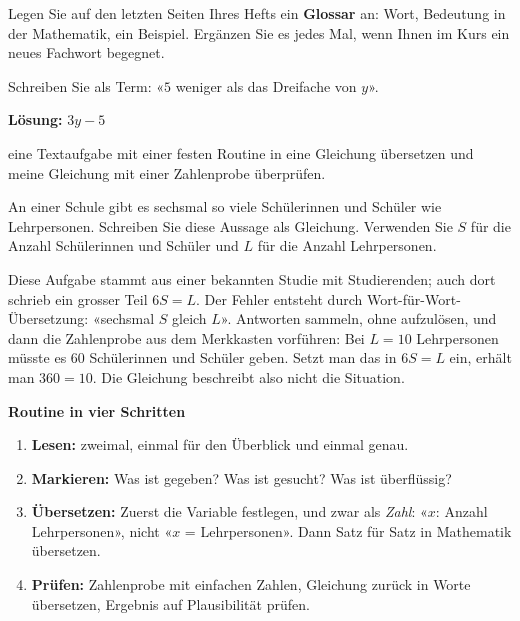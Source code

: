 \documentclass[11pt]{exam}
\begin{document}
\begin{tcolorbox}[fkbasis, colframe=fkgrau, colback=white, title={Ihr Glossar}]
Legen Sie auf den letzten Seiten Ihres Hefts ein \textbf{Glossar} an: Wort,
Bedeutung in der Mathematik, ein Beispiel. Ergänzen Sie es jedes Mal, wenn
Ihnen im Kurs ein neues Fachwort begegnet.
\end{tcolorbox}

\begin{exitfrage}
Schreiben Sie als Term: «$5$ weniger als das Dreifache von $y$».
\ifprintanswers\par\medskip\textbf{Lösung:} $3y - 5$
\else\par\vspace{1.5cm}\fi
\end{exitfrage}

\newpage
{}
  {eine Textaufgabe mit einer festen Routine in eine Gleichung übersetzen und
   meine Gleichung mit einer Zahlenprobe überprüfen.}

\begin{einstieg}
An einer Schule gibt es sechsmal so viele Schülerinnen und Schüler wie
Lehrpersonen. Schreiben Sie diese Aussage als Gleichung. Verwenden Sie $S$
für die Anzahl Schülerinnen und Schüler und $L$ für die Anzahl Lehrpersonen.
\ifprintanswers\else\par\vspace{1.5cm}\fi
\end{einstieg}

\begin{lehrperson}
Diese Aufgabe stammt aus einer bekannten Studie mit Studierenden; auch dort
schrieb ein grosser Teil $6S = L$. Der Fehler entsteht durch
Wort-für-Wort-Übersetzung: «sechsmal $S$ gleich $L$». Antworten sammeln,
ohne aufzulösen, und dann die Zahlenprobe aus dem Merkkasten vorführen:
Bei $L = 10$ Lehrpersonen müsste es $60$ Schülerinnen und Schüler geben. Setzt
man das in $6S = L$ ein, erhält man $360 = 10$. Die Gleichung beschreibt also
nicht die Situation.
\end{lehrperson}

\begin{merke}
\textbf{Routine in vier Schritten}
\begin{enumerate}
  \item \textbf{Lesen:} zweimal, einmal für den Überblick und einmal genau.
  \item \textbf{Markieren:} Was ist gegeben? Was ist gesucht? Was ist
        überflüssig?
  \item \textbf{Übersetzen:} Zuerst die Variable festlegen, und zwar als
        \emph{Zahl}: «$x$: Anzahl Lehrpersonen», nicht «$x$ = Lehrpersonen».
        Dann Satz für Satz in Mathematik übersetzen.
  \item \textbf{Prüfen:} Zahlenprobe mit einfachen Zahlen, Gleichung zurück in
        Worte übersetzen, Ergebnis auf Plausibilität prüfen.
\end{enumerate}
\end{merke}
\end{document}
